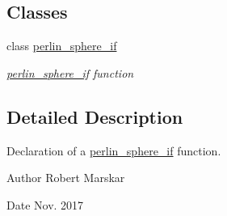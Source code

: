 \subsection*{Classes}
\begin{DoxyCompactItemize}
\item 
class \hyperlink{classperlin__sphere__if}{perlin\+\_\+sphere\+\_\+if}
\begin{DoxyCompactList}\small\item\em \hyperlink{classperlin__sphere__if}{perlin\+\_\+sphere\+\_\+if} function \end{DoxyCompactList}\end{DoxyCompactItemize}


\subsection{Detailed Description}
Declaration of a \hyperlink{classperlin__sphere__if}{perlin\+\_\+sphere\+\_\+if} function. 

\begin{DoxyAuthor}{Author}
Robert Marskar 
\end{DoxyAuthor}
\begin{DoxyDate}{Date}
Nov. 2017 
\end{DoxyDate}
